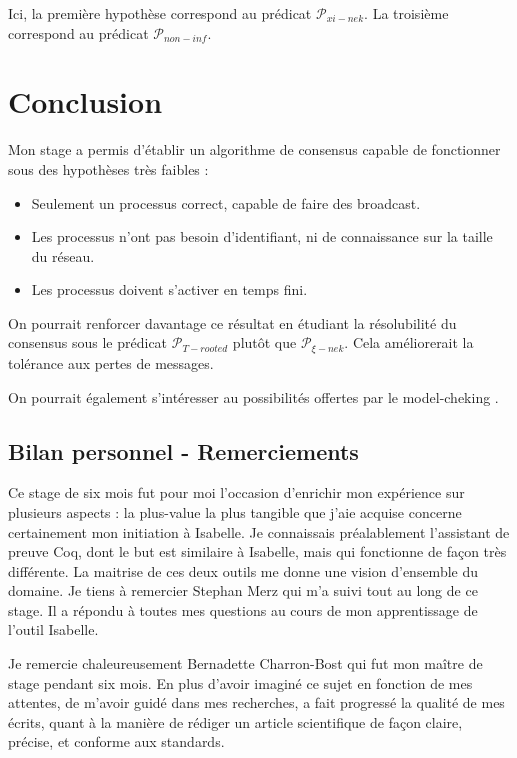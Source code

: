 \documentclass{article}
\begin{document}
Ici, la première hypothèse correspond au prédicat $\mathcal{P}_{xi-nek}$. La troisième correspond au prédicat $\mathcal{P}_{non-inf}$.

\section{Conclusion}

Mon stage a permis d'établir un algorithme de consensus capable de fonctionner sous des hypothèses très faibles :
\begin{itemize}
	\item Seulement un processus correct, capable de faire des broadcast.
	\item Les processus n'ont pas besoin d'identifiant, ni de connaissance sur la taille du réseau.
	\item Les processus doivent s'activer en temps fini.
\end{itemize}

On pourrait renforcer davantage ce résultat en étudiant la résolubilité du consensus sous le prédicat $\mathcal{P}_{T-rooted}$ plutôt que $\mathcal{P}_{\xi-nek}$.
Cela améliorerait la tolérance aux pertes de messages.

On pourrait également s'intéresser au possibilités offertes par le model-cheking \cite{model_checking}.

\subsection{Bilan personnel - Remerciements}

Ce stage de six mois fut pour moi l'occasion d'enrichir mon expérience sur plusieurs aspects :
la plus-value la plus tangible que j'aie acquise concerne certainement mon initiation à Isabelle. Je connaissais préalablement l'assistant de preuve Coq, dont le but est similaire à Isabelle,
mais qui fonctionne de façon très différente. La maitrise de ces deux outils me donne une vision d'ensemble du domaine.
Je tiens à remercier Stephan Merz qui m'a suivi tout au long de ce stage. Il a répondu à toutes mes questions au cours de mon apprentissage de l'outil Isabelle.

Je remercie chaleureusement Bernadette Charron-Bost qui fut mon maître de stage pendant six mois.
En plus d’avoir imaginé ce sujet en fonction de mes attentes, de m’avoir guidé dans mes recherches, a fait progressé la qualité de mes
écrits, quant à la manière de rédiger un article scientifique de façon claire, précise, et conforme aux standards.
\end{document}
